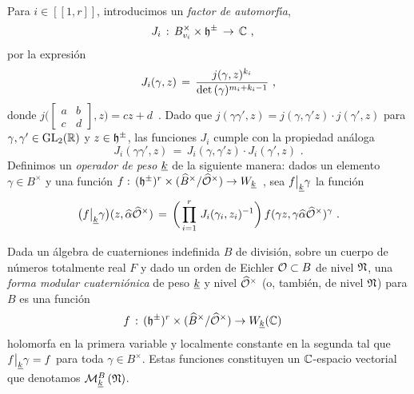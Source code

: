 Para $i\in [\![1,r]\!]$, introducimos un \emph{factor de automorf\'{\i}a},
\begin{align*}
	J_{i} & \,:\,B_{v_{i}}^{\times}\times\hP^{\pm}\,\rightarrow\,\bb{C}
	\text{ ,}
\end{align*}
%
por la expresi\'{o}n
\begin{equation}
	\label{eq:factorddeautomorfia}
	J_{i}(\gamma,z) \,=\,\frac{j(\gamma,z)^{k_{i}}}{%
			\det(\gamma)^{m_{i}+k_{i}-1}}
	\text{ ,}
\end{equation}
%
donde
\begin{math}
	j\big(\left[\begin{smallmatrix} a & b \\
		c & d \end{smallmatrix}\right],z\big)=cz+d
\end{math}~.
Dado que $j(\gamma\gamma',z)=j(\gamma,\gamma'z)\cdot j(\gamma',z)$ para
$\gamma,\gamma'\in\GL_{2}(\bb{R})$ y $z\in\hP^{\pm}$, las funciones $J_{i}$
cumple con la propiedad an\'{a}loga
\begin{equation}
	\label{eq:factordeautomorfiacociclo}
	J_{i}(\gamma\gamma',z) \,=\,
		J_{i}(\gamma,\gamma'z)\cdot J_{i}(\gamma',z)
	\text{ .}
\end{equation}
%
Definimos un \emph{operador de peso $\peso{k}$} de la siguiente manera: dados
un elemento $\gamma\in B^{\times}$ y una funci\'{o}n
\begin{math}
	f:\,(\hP^{\pm})^{r}\times(\Idfin{B}/\Idfin{\cal{O}})\rightarrow
		W_{\peso{k}}
\end{math}~,
sea $f\operadormatrices{\peso{k}}{\gamma}$ la funci\'{o}n
\begin{equation}
	\label{eq:indefinidaoperadordepesok}
	\big(f\operadormatrices{\peso{k}}{\gamma}\big)
		(z,\hhat{\alpha}\Idfin{\cal{O}}) \,=\,
		\bigg(\prod_{i=1}^{r}\,J_{i}(\gamma_{i},z_{i})^{-1}\bigg)\,
		f(\gamma z,\gamma\hhat{\alpha}\Idfin{\cal{O}})^{\gamma}
	\text{ .}
\end{equation}
%

\begin{defFormaCuaternionicaCasoIndefinido}%
	\label{def:formacuaternionicacasoindefinido}
	Dada un \'{a}lgebra de cuaterniones indefinida $B$ de divisi\'{o}n,
	sobre un cuerpo de n\'{u}meros totalmente real $F$ y dado un orden
	de Eichler $\cal{O}\subset B$ de nivel $\frak{N}$, una
	\emph{forma modular cuaterni\'{o}nica}
	de peso $\peso{k}$ y nivel $\Idfin{\cal{O}}$ (o, tambi\'{e}n, de nivel
	$\frak{N}$) para $B$ es una funci\'{o}n
	\begin{align*}
		f & \,:\, (\hP^{\pm})^{r}\times (\Idfin{B}/
			\Idfin{\cal{O}})\rightarrow W_{\peso{k}}(\bb{C})
	\end{align*}
	holomorfa en la primera variable y localmente constante en la segunda
	tal que $f\operadormatrices{\peso{k}}{\gamma}=f$ para toda
	$\gamma\in B^{\times}$. Estas funciones constituyen un
	$\bb{C}$-espacio vectorial que denotamos $\modularH[B]{k}{\frak{N}}$.
\end{defFormaCuaternionicaCasoIndefinido}

